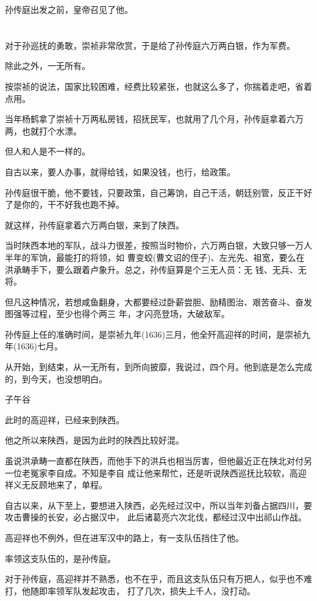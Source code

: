 \documentclass[11pt,a4paper,onecolumn]{article}
\begin{document}
孙传庭出发之前，皇帝召见了他。

\section[\thesection]{}

对于孙巡抚的勇敢，崇祯非常欣赏，于是给了孙传庭六万两白银，作为军费。

除此之外，一无所有。

按崇祯的说法，国家比较困难，经费比较紧张，也就这么多了，你揣着走吧，省着点用。

当年杨鹤拿了崇祯十万两私房钱，招抚民军，也就用了几个月，孙传庭拿着六万两，也就打个水漂。

但人和人是不一样的。

自古以来，要人办事，就得给钱，如果没钱，也行，给政策。

孙传庭很干脆，他不要钱，只要政策，自己筹饷，自己干活，朝廷别管，反正干好了是你的，干不好我也跑不掉。

就这样，孙传庭拿着六万两白银，来到了陕西。

当时陕西本地的军队，战斗力很差，按照当时物价，六万两白银，大致只够一万人半年的军饷，最能打的将领，如
曹变蛟(曹文诏的侄子)、左光先、祖宽，要么在洪承畴手下，要么跟着卢象升。总之，孙传庭算是个三无人员：无
钱、无兵、无将。

但凡这种情况，若想咸鱼翻身，大都要经过卧薪尝胆、励精图治、艰苦奋斗、奋发图强等过程，至少也得个两三
年，才闪亮登场，大破敌军。

孙传庭上任的准确时间，是崇祯九年(1636)三月，他全歼高迎祥的时间，是崇祯九年(1636)七月。

从开始，到结束，从一无所有，到所向披靡，我说过，四个月。他到底是怎么完成的，到今天，也没想明白。

子午谷

此时的高迎祥，已经来到陕西。

他之所以来陕西，是因为此时的陕西比较好混。

虽说洪承畴一直都在陕西，而他手下的洪兵也相当厉害，但他最近正在陕北对付另一位老冤家李自成。不知是李自
成让他来帮忙，还是听说陕西巡抚比较软，高迎祥义无反顾地来了，单程。

自古以来，从下至上，要想进入陕西，必先经过汉中，所以当年刘备占据四川，要攻击曹操的长安，必占据汉中，
此后诸葛亮六次北伐，都经过汉中出祁山作战。

高迎祥也不例外，但在进军汉中的路上，有一支队伍挡住了他。

率领这支队伍的，是孙传庭。

对于孙传庭，高迎祥并不熟悉，也不在乎，而且这支队伍只有万把人，似乎也不难打，他随即率领军队发起攻击，
打了几次，损失上千人，没打动。
\end{document}
